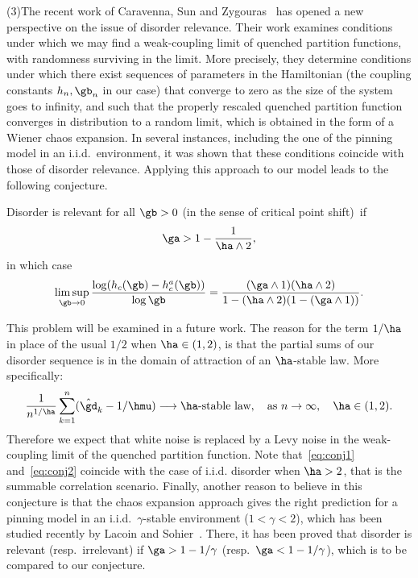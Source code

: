 \medskip
\noindent (3)\enskip The recent work of Caravenna, Sun and Zygouras~\cite{CSZ16+} has opened a new perspective on the issue of disorder relevance. Their work examines conditions under which we may find a weak-coupling limit of quenched partition functions, with randomness surviving in the limit. More precisely, they determine conditions under which there exist sequences of parameters in the Hamiltonian (the coupling constants $h_n, \gb_n$ in our case) that converge to zero as the size of the system goes to infinity, and such that the properly rescaled quenched partition function converges in distribution to a random limit, which is obtained in the form of a Wiener chaos expansion. In several instances, including the one of the pinning model in an i.i.d.~environment, it was shown that these conditions coincide with those of disorder relevance. Applying this approach to our model leads to the following conjecture.

\begin{conj}\label{ConjRelevance}
Disorder is relevant for all $\gb>0$ (in the sense of critical point shift)~if
\begin{equation}\label{eq:conj1}
\ga > 1 - \frac{1}{\ha \wedge 2},
\end{equation}
in which case
\begin{equation} \label{eq:conj2}
\limsup_{\gb \to 0} \frac{\log (h_c(\gb) - h_c^a(\gb))}{\log \gb} = \frac{(\ga\wedge 1)(\ha\wedge 2)}{1-(\ha\wedge 2)(1-(\ga\wedge 1))}.
\end{equation}
\end{conj}

This problem will be examined in a future work. The reason for the term $1/\ha$ in place of the usual $1/2$ when $\ha\in (1,2)$, is that the partial sums of our disorder sequence is in the domain of attraction of an $\ha$-stable law. More specifically:
\begin{equation}
\frac{1}{n^{1/\ha}} \sum_{k=1}^n (\hat \gd_k - 1/\hmu) \longrightarrow \ha\text{-stable law},\quad \text{as\ } n\to\infty,\quad \ha\in(1,2).
\end{equation}
Therefore we expect that white noise is replaced by a Levy noise in the weak-coupling limit of the quenched partition function. Note that~\eqref{eq:conj1} and~\eqref{eq:conj2} coincide with the case of i.i.d. disorder when $\ha>2$, that is the summable correlation scenario. Finally, another reason to believe in this conjecture is that the chaos expansion approach gives the right prediction for a pinning model in an i.i.d.~$\gamma$-stable environment ($1 < \gamma < 2$), which has been studied recently by Lacoin and Sohier~\cite{LS16+}. There, it has been proved that disorder is relevant (resp.~irrelevant) if $\ga > 1 - 1/\gamma$ (resp.~$\ga < 1 - 1/\gamma$), which is to be compared to our conjecture.

